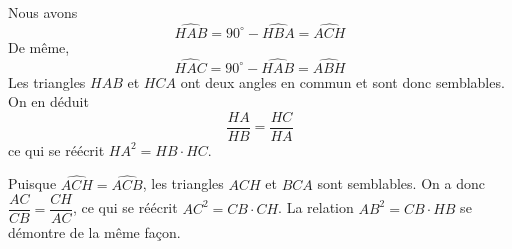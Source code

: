 \begin{sol}
\begin{center}
\end{center}

Nous avons
$$ \widehat{HAB} = 90^\circ - \widehat{HBA}=\widehat{ACH}$$
De même,
$$ \widehat{HAC} = 90^\circ-\widehat{HAB}=\widehat{ABH}$$
Les triangles $HAB$ et $HCA$ ont deux angles en commun et sont donc semblables. On en déduit
$$\frac{HA}{HB} = \frac{HC}{HA}$$
ce qui se réécrit $HA^2 = HB \cdot HC$.

Puisque $\widehat{ACH} = \widehat{ACB}$, les triangles $ACH$ et $BCA$ sont semblables. On a donc $\dfrac{AC}{CB} = \dfrac{CH}{AC}$, ce qui se réécrit $AC^2 = CB \cdot CH$. La relation $AB^2 = CB \cdot HB$ se démontre de la même façon.
\end{sol}

